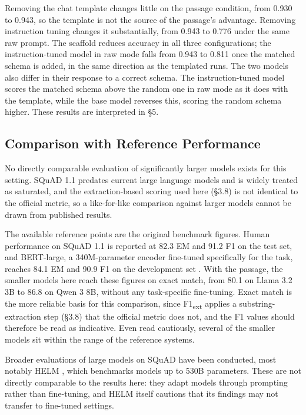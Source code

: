 \documentclass{article}
\begin{document}
Removing the chat template changes little on the passage condition, from 0.930 to 0.943, so the template is not the source of the passage's advantage. Removing instruction tuning changes it substantially, from 0.943 to 0.776 under the same raw prompt. The scaffold reduces accuracy in all three configurations; the instruction-tuned model in raw mode falls from 0.943 to 0.811 once the matched schema is added, in the same direction as the templated runs. The two models also differ in their response to a correct schema. The instruction-tuned model scores the matched schema above the random one in raw mode as it does with the template, while the base model reverses this, scoring the random schema higher. These results are interpreted in \S5.

\subsection{Comparison with Reference Performance}

No directly comparable evaluation of significantly larger models exists for this setting. SQuAD 1.1 predates current large language models and is widely treated as saturated, and the extraction-based scoring used here (\S3.8) is not identical to the official metric, so a like-for-like comparison against larger models cannot be drawn from published results.

The available reference points are the original benchmark figures. Human performance on SQuAD 1.1 is reported at 82.3 EM and 91.2 F1 on the test set, and BERT-large, a 340M-parameter encoder fine-tuned specifically for the task, reaches 84.1 EM and 90.9 F1 on the development set \cite{devlin2019bert}. With the passage, the smaller models here reach these figures on exact match, from 80.1 on Llama 3.2 3B to 86.8 on Qwen 3 8B, without any task-specific fine-tuning. Exact match is the more reliable basis for this comparison, since F1\textsubscript{ext} applies a substring-extraction step (\S3.8) that the official metric does not, and the F1 values should therefore be read as indicative. Even read cautiously, several of the smaller models sit within the range of the reference systems.

Broader evaluations of large models on SQuAD have been conducted, most notably HELM \cite{liang2022helm}, which benchmarks models up to 530B parameters. These are not directly comparable to the results here: they adapt models through prompting rather than fine-tuning, and HELM itself cautions that its findings may not transfer to fine-tuned settings.
\end{document}
